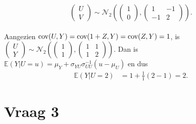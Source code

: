 \documentclass[a4paper,dutch,11pt,]{scrartcl}
\begin{document}
\[ \begin{pmatrix} U \\V \end{pmatrix} \sim \mathcal{N}_2( \begin{pmatrix} 1 \\ 0 \end{pmatrix}, \begin{pmatrix} 1 & -1 \\ -1 &  2 \end{pmatrix}).\]

\paragraph{}
Aangezien $\textnormal{cov}(U,Y)=\textnormal{cov}(1+Z,Y)=\textnormal{cov}(Z,Y)=1$, is $\begin{pmatrix} U \\ Y \end{pmatrix} \sim \mathcal{N}_2( \begin{pmatrix} 1 \\ 1\end{pmatrix}, \begin{pmatrix} 1 & 1 \\ 1 & 2 \end{pmatrix})$.
Dan is $\mathds{E}(Y|U=u) = \mu_Y + \sigma_{YU}\sigma_{UU}^{-1}(u - \mu_U )$ en dus
\begin{align*}\mathds{E}(Y|U=2) & = 1 + \frac{1}{1}(2-1) = 2.\end{align*} 

\section*{Vraag 3}
\end{document}
